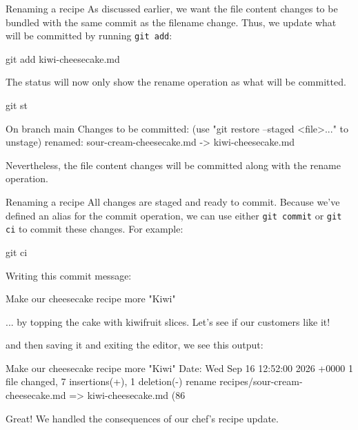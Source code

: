 \begin{frame}[fragile]{Renaming a recipe}
    As discussed earlier, we want the file content changes to be bundled
    with the same commit as the filename change.  Thus, we update what will
    be committed by running \texttt{git add}:

    \begin{shellcode}
        git add kiwi-cheesecake.md
    \end{shellcode}

    The status will now only show the rename operation as what will be
    committed.
    \begin{shellcode}
        git st
    \end{shellcode}
    \begin{outputcode}
On branch main
Changes to be committed:
  (use "git restore --staged <file>..." to unstage)
        renamed:    sour-cream-cheesecake.md -> kiwi-cheesecake.md
    \end{outputcode}

    Nevertheless, the file content changes will be committed along with the
    rename operation.
\end{frame}

\begin{frame}[fragile]{Renaming a recipe}
    All changes are staged and ready to commit.  Because we've defined an
    alias for the commit operation, we can use either
    \texttt{git commit} or \texttt{git ci} to commit
    these changes.  For example:

    \begin{shellcode}
        git ci
    \end{shellcode}

    Writing this commit message:
    \begin{outputcode}
    Make our cheesecake recipe more "Kiwi"

    ... by topping the cake with kiwifruit slices.  Let's see if our
    customers like it!
    \end{outputcode}

    and then saving it and exiting the editor, we see this output:

    \begin{outputcode}
[main e7b93eb] Make our cheesecake recipe more "Kiwi"
 Date: Wed Sep 16 12:52:00 2026 +0000
 1 file changed, 7 insertions(+), 1 deletion(-)
 rename recipes/{sour-cream-cheesecake.md => kiwi-cheesecake.md} (86%
    \end{outputcode}

    Great!  We handled the consequences of our chef's recipe update.
\end{frame}

